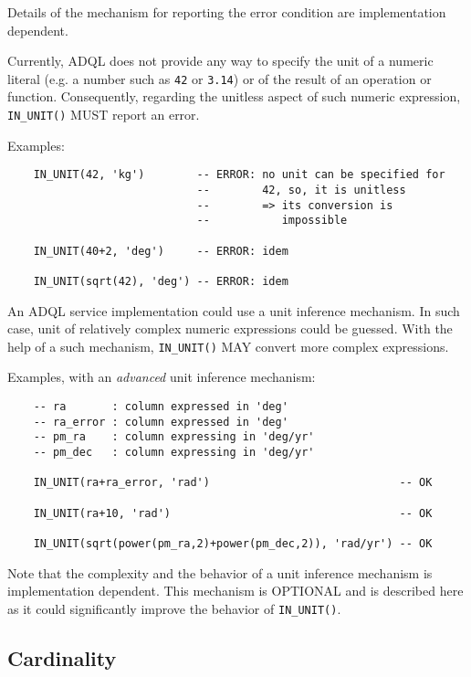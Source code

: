\documentclass[11pt,a4paper]{ivoa}
\begin{document}
Details of the mechanism for reporting the error condition are implementation
dependent.

Currently, ADQL does not provide any way to specify the unit of a numeric
literal (e.g. a number such as \verb:42: or \verb:3.14:) or of the result of an
operation or function. Consequently, regarding the unitless aspect of such
numeric expression, \verb:IN_UNIT(): MUST report an error.

Examples:

\begin{verbatim}
    IN_UNIT(42, 'kg')        -- ERROR: no unit can be specified for
                             --        42, so, it is unitless
                             --        => its conversion is
                             --           impossible

    IN_UNIT(40+2, 'deg')     -- ERROR: idem

    IN_UNIT(sqrt(42), 'deg') -- ERROR: idem
\end{verbatim}

An ADQL service implementation could use a unit inference mechanism. In such
case, unit of relatively complex numeric expressions could be guessed. With the
help of a such mechanism, \verb:IN_UNIT(): MAY convert more complex
expressions.

Examples, with an \emph{advanced} unit inference mechanism:

\begin{verbatim}
    -- ra       : column expressed in 'deg'
    -- ra_error : column expressed in 'deg'
    -- pm_ra    : column expressing in 'deg/yr'
    -- pm_dec   : column expressing in 'deg/yr'

    IN_UNIT(ra+ra_error, 'rad')                             -- OK

    IN_UNIT(ra+10, 'rad')                                   -- OK

    IN_UNIT(sqrt(power(pm_ra,2)+power(pm_dec,2)), 'rad/yr') -- OK
\end{verbatim}

Note that the complexity and the behavior of a unit inference mechanism is
implementation dependent. This mechanism is OPTIONAL and is described here
as it could significantly improve the behavior of \verb:IN_UNIT():.

\subsection{Cardinality}
\label{sec:cardinality}
\end{document}
